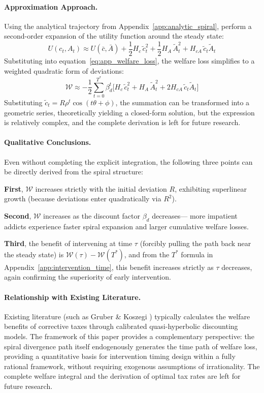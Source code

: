 \documentclass[12pt]{article}
\begin{document}
\paragraph{Approximation Approach.}
Using the analytical trajectory from Appendix~\ref{app:analytic_spiral},
perform a second-order expansion of the utility function around the steady state:
\begin{equation}
U(c_t, A_t) \approx U(\bar{c}, \bar{A})
+ \frac{1}{2}H_c\,\tilde{c}_t^2
+ \frac{1}{2}H_A\,\tilde{A}_t^2
+ H_{cA}\,\tilde{c}_t\tilde{A}_t
\end{equation}
Substituting into equation~\eqref{eq:app_welfare_loss}, the welfare loss simplifies to a weighted quadratic form of deviations:
\begin{equation}
\mathcal{W} \approx -\frac{1}{2}\sum_{t=0}^{T^*}\beta_d^t
\bigl[H_c\,\tilde{c}_t^2 + H_A\,\tilde{A}_t^2
+ 2H_{cA}\,\tilde{c}_t\tilde{A}_t\bigr]
\end{equation}
Substituting $\tilde{c}_t = R\rho^t\cos(t\theta+\phi)$,
the summation can be transformed into a geometric series, theoretically yielding a closed-form solution,
but the expression is relatively complex, and the complete derivation is left for future research.

\paragraph{Qualitative Conclusions.}
Even without completing the explicit integration, the following three points can be directly derived from the spiral structure:

\textbf{First}, $\mathcal{W}$ increases strictly with the initial deviation $R$,
exhibiting superlinear growth (because deviations enter quadratically via $R^2$).

\textbf{Second}, $\mathcal{W}$ increases as the discount factor $\beta_d$ decreases---
more impatient addicts experience faster spiral expansion and larger cumulative welfare losses.

\textbf{Third}, the benefit of intervening at time $\tau$ (forcibly pulling the path back near the steady state) is
$\mathcal{W}(\tau) - \mathcal{W}(T^*)$,
and from the $T^*$ formula in Appendix~\ref{app:intervention_time},
this benefit increases strictly as $\tau$ decreases, again confirming the superiority of early intervention.

\paragraph{Relationship with Existing Literature.}
Existing literature (such as Gruber \& Koszegi \cite{Gruber2001}) typically
calculates the welfare benefits of corrective taxes through calibrated quasi-hyperbolic discounting models.
The framework of this paper provides a complementary perspective: the spiral divergence path itself endogenously generates the time path of welfare loss,
providing a quantitative basis for intervention timing design within a fully rational framework, without requiring exogenous assumptions of irrationality.
The complete welfare integral and the derivation of optimal tax rates are left for future research.
\end{document}
